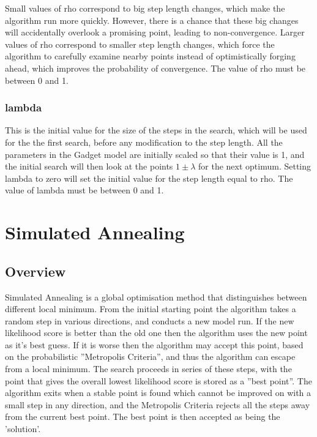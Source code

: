 \documentclass [a4paper, 10pt]{book}
\begin{document}
\bigskip
Small values of rho correspond to big step length changes, which make the algorithm run more quickly.  However, there is a chance that these big changes will accidentally overlook a promising point, leading to non-convergence.  Larger values of rho correspond to smaller step length changes, which force the algorithm to carefully examine nearby points instead of optimistically forging ahead, which improves the probability of convergence.  The value of rho must be between 0 and 1.

\subsubsection{lambda}
This is the initial value for the size of the steps in the search, which will be used for the the first search, before any modification to the step length.  All the parameters in the Gadget model are initially scaled so that their value is 1, and the initial search will then look at the points $1 \pm \lambda$ for the next optimum.  Setting lambda to zero will set the initial value for the step length equal to rho.  The value of lambda must be between 0 and 1.


\section{Simulated Annealing}\label{sec:simann}
\subsection{Overview}\label{subsec:simannover}
Simulated Annealing is a global optimisation method that distinguishes between different local minimum.  From the initial starting point the algorithm takes a random step in various directions, and conducts a new model run.  If the new likelihood score is better than the old one then the algorithm uses the new point as it's best guess.  If it is worse then the algorithm may accept this point, based on the probabilistic ''Metropolis Criteria'', and thus the algorithm can escape from a local minimum.  The search proceeds in series of these steps, with the point that gives the overall lowest likelihood score is stored as a ''best point''.  The algorithm exits when a stable point is found which cannot be improved on with a small step in any direction, and the Metropolis Criteria rejects all the steps away from the current best point.  The best point is then accepted as being the 'solution'.
\end{document}
